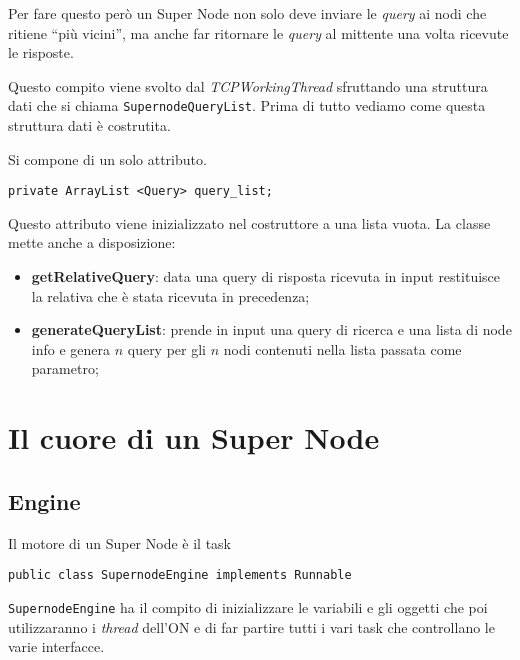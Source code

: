 Per fare questo però un Super Node non solo deve inviare le \emph{query} ai nodi che ritiene ``più vicini'', ma anche far ritornare le \emph{query} al mittente una volta ricevute le risposte.

Questo compito viene svolto dal \emph{TCPWorkingThread} sfruttando una struttura dati che si chiama \verb|SupernodeQueryList|.
Prima di tutto vediamo come questa struttura dati è costrutita.

Si compone di un solo attributo.
\begin{lstlisting}
private ArrayList <Query> query_list;
\end{lstlisting}
Questo attributo viene inizializzato nel costruttore a una lista vuota.
La classe mette anche a disposizione:
\begin{itemize}
 \item \textbf{getRelativeQuery}: data una query di risposta ricevuta in input restituisce la relativa che è stata ricevuta in precedenza;
 \item \textbf{generateQueryList}: prende in input una query di ricerca e una lista di node info e genera $n$ query per gli $n$ nodi contenuti nella lista passata come parametro;
\end{itemize}



\section{Il cuore di un Super Node}
\subsection{Engine}
Il motore di un Super Node è il task 
\begin{verbatim}
public class SupernodeEngine implements Runnable
\end{verbatim}
\verb|SupernodeEngine| ha il compito di inizializzare le variabili e gli oggetti che poi utilizzaranno i \emph{thread} dell'ON e di far partire tutti i vari task che controllano le varie interfacce.

